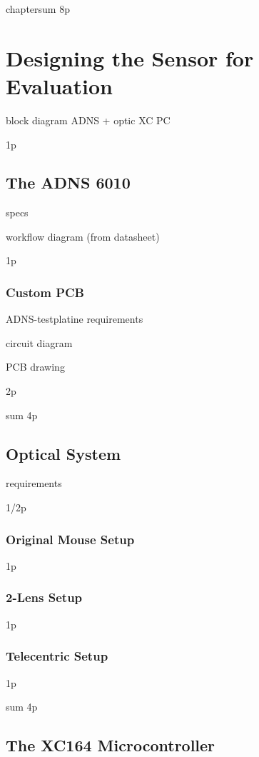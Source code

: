 \documentclass[12pt,a4paper]{article}
\begin{document}
chaptersum 8p

\section{Designing the Sensor for Evaluation}

block diagram
  ADNS + optic
  XC
  PC

1p

\subsection{The ADNS 6010}

specs

workflow diagram (from datasheet)

1p

\subsubsection{Custom PCB}
ADNS-testplatine
  requirements

  circuit diagram

  PCB drawing

2p

sum 4p
  
\subsection{Optical System}
  requirements

1/2p

\subsubsection{Original Mouse Setup}

1p

\subsubsection{2-Lens Setup}

1p

\subsubsection{Telecentric Setup}

1p

sum 4p
\subsection{The XC164 Microcontroller}
\end{document}
